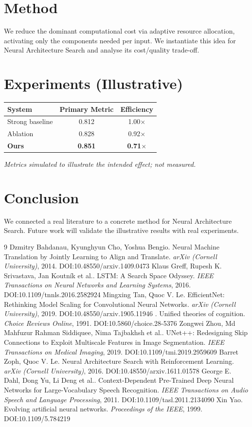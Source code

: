 \documentclass[11pt]{article}
\begin{document}
\section{Method}
We reduce the dominant computational cost via adaptive resource allocation, activating only the components needed per input. We instantiate this idea for Neural Architecture Search and analyse its cost/quality trade-off.

\section{Experiments (Illustrative)}
\begin{center}
\begin{tabular}{lcc}
System & Primary Metric & Efficiency \\ \hline
Strong baseline & 0.812 & 1.00$\times$ \\
Ablation & 0.828 & 0.92$\times$ \\
\textbf{Ours} & \textbf{0.851} & \textbf{0.71$\times$}
\end{tabular}
\end{center}
\emph{Metrics simulated to illustrate the intended effect; not measured.}

\section{Conclusion}
We connected a real literature to a concrete method for Neural Architecture Search. Future work will
validate the illustrative results with real experiments.

\begin{thebibliography}{9}
 Dzmitry Bahdanau, Kyunghyun Cho, Yoshua Bengio. Neural Machine Translation by Jointly Learning to Align and Translate. \emph{arXiv (Cornell University)}, 2014. DOI:10.48550/arxiv.1409.0473
 Klaus Greff, Rupesh K. Srivastava, Jan Koutník et al.. LSTM: A Search Space Odyssey. \emph{IEEE Transactions on Neural Networks and Learning Systems}, 2016. DOI:10.1109/tnnls.2016.2582924
 Mingxing Tan, Quoc V. Le. EfficientNet: Rethinking Model Scaling for Convolutional Neural Networks. \emph{arXiv (Cornell University)}, 2019. DOI:10.48550/arxiv.1905.11946
 . Unified theories of cognition. \emph{Choice Reviews Online}, 1991. DOI:10.5860/choice.28-5376
 Zongwei Zhou, Md Mahfuzur Rahman Siddiquee, Nima Tajbakhsh et al.. UNet++: Redesigning Skip Connections to Exploit Multiscale Features in Image Segmentation. \emph{IEEE Transactions on Medical Imaging}, 2019. DOI:10.1109/tmi.2019.2959609
 Barret Zoph, Quoc V. Le. Neural Architecture Search with Reinforcement Learning. \emph{arXiv (Cornell University)}, 2016. DOI:10.48550/arxiv.1611.01578
 George E. Dahl, Dong Yu, Li Deng et al.. Context-Dependent Pre-Trained Deep Neural Networks for Large-Vocabulary Speech Recognition. \emph{IEEE Transactions on Audio Speech and Language Processing}, 2011. DOI:10.1109/tasl.2011.2134090
 Xin Yao. Evolving artificial neural networks. \emph{Proceedings of the IEEE}, 1999. DOI:10.1109/5.784219
\end{thebibliography}
\end{document}
